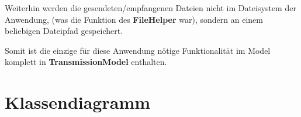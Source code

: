 \documentclass[a4paper]{scrreprt}
\begin{document}
Weiterhin werden die gesendeten/empfangenen Dateien nicht im Dateisystem der Anwendung, (was die Funktion des \textbf{FileHelper} war), sondern an einem beliebigen Dateipfad gespeichert.

Somit ist die einzige für diese Anwendung nötige Funktionalität im Model komplett in \textbf{TransmissionModel} enthalten.


\chapter{Klassendiagramm}


\printnoidxglossaries

\listoffigures
 
\end{document}
